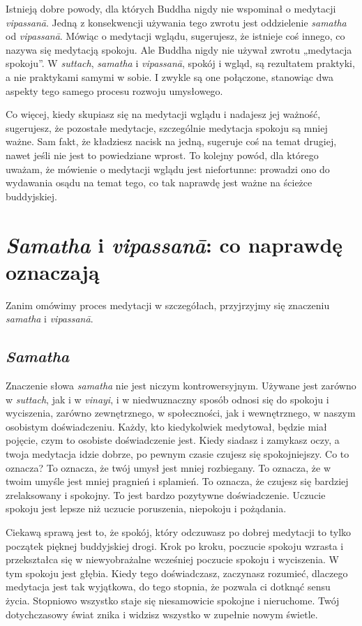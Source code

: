 \documentclass[12pt,openany]{book}
\begin{document}
Istnieją dobre powody, dla których Buddha nigdy nie wspominał o medytacji \textit{vipassanā}. Jedną z konsekwencji używania tego zwrotu jest oddzielenie \textit{samatha} od \textit{vipassanā}. Mówiąc o medytacji wglądu, sugerujesz, że istnieje coś innego, co nazywa się medytacją spokoju. Ale Buddha nigdy nie używał zwrotu „medytacja spokoju”. W \textit{suttach}, \textit{samatha} i \textit{vipassanā}, spokój i wgląd, są rezultatem praktyki, a nie praktykami samymi w sobie. I zwykle są one połączone, stanowiąc dwa aspekty tego samego procesu rozwoju umysłowego.

Co więcej, kiedy skupiasz się na medytacji wglądu i nadajesz jej ważność, sugerujesz, że pozostałe medytacje, szczególnie medytacja spokoju są mniej ważne. Sam fakt, że kładziesz nacisk na jedną, sugeruje coś na temat drugiej, nawet jeśli nie jest to powiedziane wprost. To kolejny powód, dla którego uważam, że mówienie o medytacji wglądu jest niefortunne: prowadzi ono do wydawania osądu na temat tego, co tak naprawdę jest ważne na ścieżce buddyjskiej.

\chapter*{\textit{Samatha} i \textit{vipassanā}: co naprawdę oznaczają}

Zanim omówimy proces medytacji w szczegółach, przyjrzyjmy się znaczeniu  \textit{samatha} i \textit{vipassanā}.

\section*{\textit{Samatha}}

Znaczenie słowa \textit{samatha} nie jest niczym kontrowersyjnym. Używane jest zarówno w \textit{suttach}, jak i w \textit{vinayi}, i w niedwuznaczny sposób odnosi się do spokoju i wyciszenia, zarówno zewnętrznego, w społeczności, jak i wewnętrznego, w naszym osobistym doświadczeniu. Każdy, kto kiedykolwiek medytował, będzie miał pojęcie, czym to osobiste doświadczenie jest. Kiedy siadasz i zamykasz oczy, a twoja medytacja idzie dobrze, po pewnym czasie czujesz się spokojniejszy. Co to oznacza? To oznacza, że twój umysł jest mniej rozbiegany. To oznacza, że w twoim umyśle jest mniej pragnień i splamień. To oznacza, że czujesz się bardziej zrelaksowany i spokojny. To jest bardzo pozytywne doświadczenie. Uczucie spokoju jest lepsze niż uczucie poruszenia, niepokoju i pożądania.

Ciekawą sprawą jest to, że spokój, który odczuwasz po dobrej medytacji to tylko początek pięknej buddyjskiej drogi. Krok po kroku, poczucie spokoju wzrasta i przekształca się w niewyobrażalne wcześniej poczucie spokoju i wyciszenia. W tym spokoju jest głębia. Kiedy tego doświadczasz, zaczynasz rozumieć, dlaczego medytacja jest tak wyjątkowa, do tego stopnia, że pozwala ci dotknąć sensu życia. Stopniowo wszystko staje się niesamowicie spokojne i nieruchome. Twój dotychczasowy świat znika i widzisz wszystko w zupełnie nowym świetle.
\end{document}
